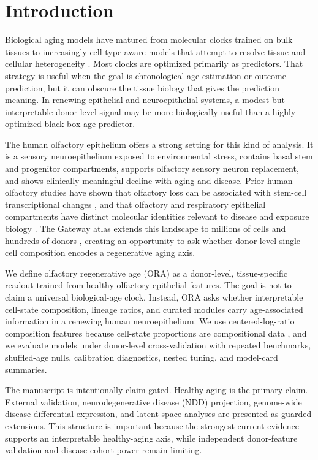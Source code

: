 \documentclass[11pt]{article}
\begin{document}
\section{Introduction}

Biological aging models have matured from molecular clocks trained on bulk tissues to increasingly cell-type-aware models that attempt to resolve tissue and cellular heterogeneity \citep{horvath2013,scageclock2026,immuneclock2026}. Most clocks are optimized primarily as predictors. That strategy is useful when the goal is chronological-age estimation or outcome prediction, but it can obscure the tissue biology that gives the prediction meaning. In renewing epithelial and neuroepithelial systems, a modest but interpretable donor-level signal may be more biologically useful than a highly optimized black-box age predictor.

The human olfactory epithelium offers a strong setting for this kind of analysis. It is a sensory neuroepithelium exposed to environmental stress, contains basal stem and progenitor compartments, supports olfactory sensory neuron replacement, and shows clinically meaningful decline with aging and disease. Prior human olfactory studies have shown that olfactory loss can be associated with stem-cell transcriptional changes \citep{oliva2022}, and that olfactory and respiratory epithelial compartments have distinct molecular identities relevant to disease and exposure biology \citep{fodoulian2020}. The Gateway atlas extends this landscape to millions of cells and hundreds of donors \citep{gateway2026}, creating an opportunity to ask whether donor-level single-cell composition encodes a regenerative aging axis.

We define olfactory regenerative age (ORA) as a donor-level, tissue-specific readout trained from healthy olfactory epithelial features. The goal is not to claim a universal biological-age clock. Instead, ORA asks whether interpretable cell-state composition, lineage ratios, and curated modules carry age-associated information in a renewing human neuroepithelium. We use centered-log-ratio composition features because cell-state proportions are compositional data \citep{aitchison1982}, and we evaluate models under donor-level cross-validation with repeated benchmarks, shuffled-age nulls, calibration diagnostics, nested tuning, and model-card summaries.

The manuscript is intentionally claim-gated. Healthy aging is the primary claim. External validation, neurodegenerative disease (NDD) projection, genome-wide disease differential expression, and latent-space analyses are presented as guarded extensions. This structure is important because the strongest current evidence supports an interpretable healthy-aging axis, while independent donor-feature validation and disease cohort power remain limiting.
\end{document}
